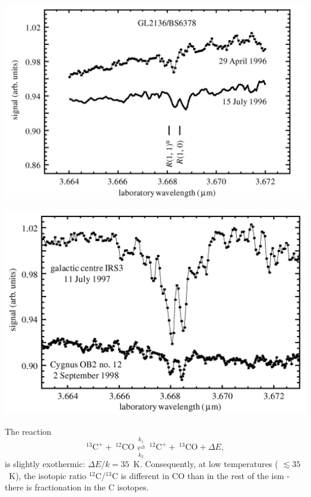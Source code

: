 \foilhead{}
\begin{center}
  \includegraphics[width=25cm,height=!]{./B/h3_discspec.jpg}
\end{center}

\foilhead{}
\begin{center}
  \includegraphics[width=25cm,height=!]{./B/h3_other.jpg}
\end{center}




The reaction \[ ^{13}\mathrm{C}^{+} + ~^{12}\mathrm{CO}
\overset{k_1}{\underset{k_2}{\rightleftharpoons}} ~^{12}\mathrm{C}^{+}
+ ~^{13}\mathrm{CO} + \Delta E, \]is slightly exothermic: $\Delta E /
k = 35$~K. Consequently, at low temperatures ( $\lesssim 35$~K), the
isotopic ratio $^{12}$C/$^{13}$C is different in CO than in the rest
of the {\sc ism} - there is fractionation in the C isotopes.


